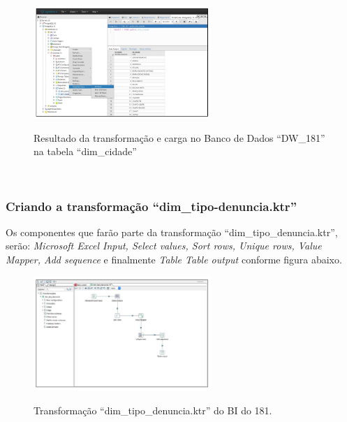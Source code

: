 \begin{figure}[H]
	\vspace*{0,2cm}
    \centering
    \caption{Resultado da transforma\c{c}\~{a}o e carga no Banco de Dados ``DW\_181'' na tabela ``dim\_cidade''}
    \includegraphics[width=0.6\textwidth]{./04-figuras/figura-res-dim-cidade}
    \label{fig:ilustfigresultdimcidade}
\end{figure}
\vspace*{-0,9cm}
{\raggedright {}} \\

\subsubsection{Criando a transforma\c{c}\~{a}o ``dim\_tipo-denuncia.ktr''}

Os componentes que far\~{a}o parte da transforma\c{c}\~{a}o ``dim\_tipo\_denuncia.ktr'', ser\~{a}o: \textit{Microsoft Excel Input, Select values, Sort rows, Unique rows, Value Mapper, Add sequence} e finalmente \textit{Table Table output} conforme figura abaixo. 

\begin{figure}[H]
	\vspace*{0,2cm}
    \centering
    \caption{Transforma\c{c}\~{a}o ``dim\_tipo\_denuncia.ktr'' do BI do 181.}
    \includegraphics[width=0.6\textwidth]{./04-figuras/figura-dim-tipo-denuncia}
    \label{fig:ilustfigrdimtipodenuncia}
\end{figure}
\vspace*{-0,9cm}
{\raggedright {}} \\

